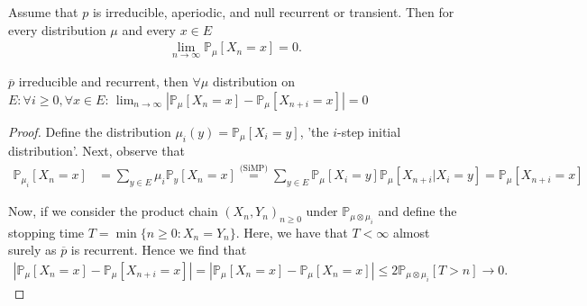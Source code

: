 \begin{theorem}[]
	Assume that $p$ is irreducible, aperiodic, and null recurrent or transient. Then for every distribution $\mu $ and every $x \in E$  
	\begin{align}
\boxed{	\lim_{n \to \infty}\mathbb{P}_{\mu } \left[ X_n =x \right] = 0 }
.	\end{align}
	
\end{theorem}
\begin{lemma}[]
	$\overline{p}$ irreducible and recurrent, then $\forall \mu $ distribution on $E: \forall i\geq 0, \forall x \in E:\, \lim_{n \to \infty} | \mathbb{P}_{\mu } \left[ X_n=x \right] - \mathbb{P}_{\mu } \left[ X_{n+i}=x \right] | = 0$
\end{lemma}
\begin{proof}
	Define the distribution $\mu_i(y) = \mathbb{P}_{\mu } \left[ X_i = y \right] $, 'the $i$-step initial distribution'. Next, observe that
\begin{align}
	\mathbb{P}_{\mu _i} \left[ X_n = x \right] &= \sum_{y \in E}^{} \mu _i \mathbb{P}_{y} \left[ X_n = x \right] 
	\stackrel{\textrm{(SiMP)}}{=} \sum_{y \in E}^{} \mathbb{P}_{\mu } \left[ X_i = y \right] \mathbb{P}_{\mu } \left[ X_{n+i} | X_i = y\right] 
	= \mathbb{P}_{\mu } \left[ X_{n+i}=x \right] 
\end{align}

Now, if we consider the product chain $(X_n, Y_n)_{n\geq 0}$ under $\mathbb{P}_{\mu \otimes \mu_i} $ and define the stopping time $T= \min\{n\geq 0: X_n = Y_n\}$. Here, we have that $T<\infty$ almost surely as $\overline{p}$ is recurrent. Hence we find that
\begin{align}
	\left| \mathbb{P}_{\mu } \left[ X_n = x \right] - \mathbb{P}_{\mu } \left[ X_{n+i} = x \right] \right|
	= \left| \mathbb{P}_{\mu } \left[ X_n = x \right] - \mathbb{P}_{\mu} \left[ X_n = x \right] \right| 
	\leq 2  \mathbb{P}_{\mu \otimes \mu _i} \left[ T>n \right]  \to 0.
\end{align}
\end{proof}

